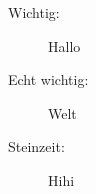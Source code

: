 \documentclass{article}
\begin{document}
    \begin{description}
        \item[Wichtig:] Hallo
        \item[Echt wichtig:] Welt
        \item[Steinzeit:] Hihi
    \end{description}
\end{document}
